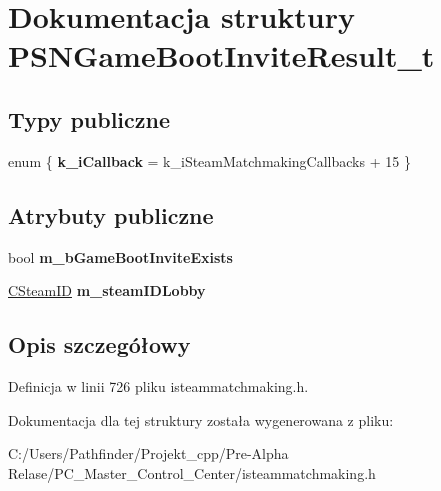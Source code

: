 \hypertarget{struct_p_s_n_game_boot_invite_result__t}{}\section{Dokumentacja struktury P\+S\+N\+Game\+Boot\+Invite\+Result\+\_\+t}
\label{struct_p_s_n_game_boot_invite_result__t}
\subsection*{Typy publiczne}
\begin{DoxyCompactItemize}
\item 
\mbox{\label{struct_p_s_n_game_boot_invite_result__t_a7c5299da2f49cdba7fd0971f8c95fe0c}} 
enum \{ {\bfseries k\+\_\+i\+Callback} = k\+\_\+i\+Steam\+Matchmaking\+Callbacks + 15
 \}
\end{DoxyCompactItemize}
\subsection*{Atrybuty publiczne}
\begin{DoxyCompactItemize}
\item 
\mbox{\label{struct_p_s_n_game_boot_invite_result__t_aa4eecdb30a11e49cd05c49ec48a990c3}} 
bool {\bfseries m\+\_\+b\+Game\+Boot\+Invite\+Exists}
\item 
\mbox{\label{struct_p_s_n_game_boot_invite_result__t_aef8a05cf9051ddb70c354905884ddbe6}} 
\hyperlink{class_c_steam_i_d}{C\+Steam\+ID} {\bfseries m\+\_\+steam\+I\+D\+Lobby}
\end{DoxyCompactItemize}


\subsection{Opis szczegółowy}


Definicja w linii 726 pliku isteammatchmaking.\+h.



Dokumentacja dla tej struktury została wygenerowana z pliku\+:\begin{DoxyCompactItemize}
\item 
C\+:/\+Users/\+Pathfinder/\+Projekt\+\_\+cpp/\+Pre-\/\+Alpha Relase/\+P\+C\+\_\+\+Master\+\_\+\+Control\+\_\+\+Center/isteammatchmaking.\+h\end{DoxyCompactItemize}
